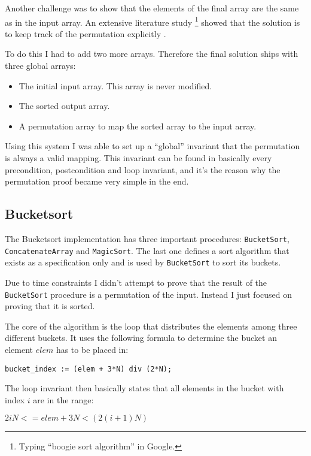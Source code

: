 \documentclass[a4paper,10pt]{article}
\begin{document}
Another challenge was to show that the elements of the final array are the same as in the input array.
An extensive literature study \footnote{Typing ``boogie sort algorithm'' in Google.} showed that the solution is to 
keep track of the permutation explicitly \cite{web:boogie:bubblesort}.

To do this I had to add two more arrays.
Therefore the final solution ships with three global arrays:
\begin{itemize}
 \item The initial input array. This array is never modified.
 \item The sorted output array.
 \item A permutation array to map the sorted array to the input array.
\end{itemize}

Using this system I was able to set up a ``global'' invariant that the permutation is always a valid mapping.
This invariant can be found in basically every precondition, postcondition and loop invariant, and it's the reason why the permutation proof became very simple in the end.

\subsection{Bucketsort}

The Bucketsort implementation has three important procedures: \lstinline!BucketSort!, \lstinline!ConcatenateArray! and \lstinline!MagicSort!.
The last one defines a sort algorithm that exists as a specification only and is used by \lstinline!BucketSort! to sort its buckets.

Due to time constraints I didn't attempt to prove that the result of the \lstinline!BucketSort! procedure is a permutation of the input.
Instead I just focused on proving that it is sorted.

The core of the algorithm is the loop that distributes the elements among three different buckets.
It uses the following formula to determine the bucket an element $elem$ has to be placed in:

\begin {center}
\lstinline!bucket_index := (elem + 3*N) div (2*N);!
\end {center}

The loop invariant then basically states that all elements in the bucket with index $i$ are in the range:
\begin {center}
$2iN <= elem + 3N < (2(i+1)N)$
\end {center}
\end{document}
